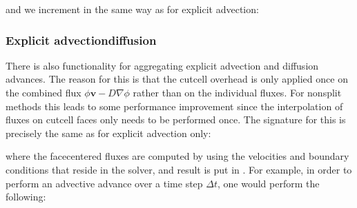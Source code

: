 \documentclass[letterpaper,10pt,english]{sphinxmanual}
\begin{document}
and we increment in the same way as for explicit advection:

\begin{sphinxVerbatim}[commandchars=\\\{\},formatcom=\scriptsize]
  
      
\end{sphinxVerbatim}


\subsubsection{Explicit advection\sphinxhyphen{}diffusion}
\label{\detokenize{CDR:explicit-advection-diffusion}}\label{\detokenize{CDR:chap-explicitadvectiondiffusion}}
There is also functionality for aggregating explicit advection and diffusion advances.
The reason for this is that the cut\sphinxhyphen{}cell overhead is only applied once on the combined flux \(\phi\mathbf{v} - D\nabla\phi\) rather than on the individual fluxes.
For non\sphinxhyphen{}split methods this leads to some performance improvement since the interpolation of fluxes on cut\sphinxhyphen{}cell faces only needs to be performed once.
The signature for this is precisely the same as for explicit advection only:

\begin{sphinxVerbatim}[commandchars=\\\{\},formatcom=\scriptsize]
        
\end{sphinxVerbatim}

where the face\sphinxhyphen{}centered fluxes are computed by using the velocities and boundary conditions that reside in the solver, and result is put in .
For example, in order to perform an advective advance over a time step \(\Delta t\), one would perform the following:
\end{document}
